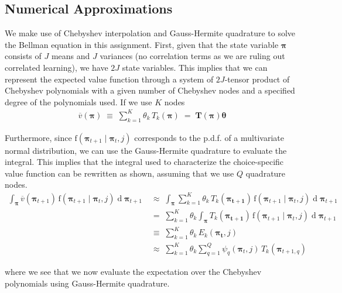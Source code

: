 \documentclass[11pt]{article}
\begin{document}
\subsection*{Numerical Approximations}
We make use of Chebyshev interpolation and Gauss-Hermite quadrature to solve the Bellman equation in this assignment. First, given that the state variable $\boldsymbol{\pi}$ consists of $J$ means and $J$ variances (no correlation terms as we are ruling out correlated learning), we have $2J$ state variables. This implies that we can represent the expected value function through a system of $2J$-tensor product of Chebyshev polynomials with a given number of Chebyshev nodes and a specified degree of the polynomials used. If we use $K$ nodes
\begin{gather*}
    \overline{v}(\boldsymbol{\pi}) \; \equiv \; \sum_{k = 1}^K \theta_k \, {T}_k(\boldsymbol{\pi}) \; = \; \boldsymbol{T}(\boldsymbol{\pi}) \boldsymbol{\theta}
\end{gather*}

\noindent Furthermore, since $\text{f}\left( \boldsymbol{\pi}_{t+1} \mid \boldsymbol{\pi}_{t}, j\right)$ corresponds to the p.d.f. of a multivariate normal distribution, we can use the Gauss-Hermite quadrature to evaluate the integral. This implies that the integral used to characterize the choice-specific value function can be rewritten as shown, assuming that we use $Q$ quadrature nodes.
\begin{align*}
\int_{\boldsymbol{\pi}}\overline{v}(\boldsymbol{\pi}_{t+1}) \, \text{f}\left( \boldsymbol{\pi}_{t+1} \mid \boldsymbol{\pi}_{t}, j\right) \operatorname{d}\boldsymbol{\pi}_{t+1} \; & \approx \; \int_{\boldsymbol{\pi}} \sum_{k = 1}^K \theta_k \, T_k(\boldsymbol{\pi_{t+1}})\, \text{f}\left( \boldsymbol{\pi}_{t+1} \mid \boldsymbol{\pi}_{t}, j\right) \operatorname{d}\boldsymbol{\pi}_{t+1} \\
& = \; \sum_{k = 1}^K \theta_k \int_{\boldsymbol{\pi}} T_k(\boldsymbol{\pi_{t+1}})\, \text{f}\left( \boldsymbol{\pi}_{t+1} \mid \boldsymbol{\pi}_{t}, j\right) \operatorname{d}\boldsymbol{\pi}_{t+1}  \\
& \equiv \; \sum_{k = 1}^K \theta_k \,  E_k (\boldsymbol{\pi_t}, j) \\
& \approx \;  \sum_{k = 1}^K \theta_k \sum_{q = 1}^Q  \psi_{q}\left(  \boldsymbol{\pi}_t, j\right) \, T_k (\boldsymbol{\pi}_{t+1, q} )
\end{align*}

\noindent where we see that we now evaluate the expectation over the Chebyshev polynomials using Gauss-Hermite quadrature. \\
\end{document}
